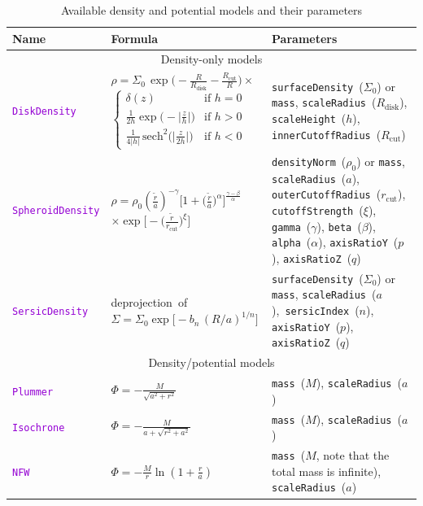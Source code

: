 \documentclass[12pt]{article}
\newcommand{\ttt}[1]{\textcolor{darkviolet}{\texttt{#1}}}
\newcommand{\ppp}[1]{\textcolor{darkolive} {\texttt{#1}}}
\begin{document}
\begin{table}
\caption{Available density and potential models and their parameters}  \label{tab:PotentialParams}
\begin{tabular}{l m{5cm} >{\raggedright\arraybackslash}m{6cm}}
Name & Formula & Parameters \\
\hline
\multicolumn{3}{c}{Density-only models} \\[2mm]
\ttt{DiskDensity} & $\rho = \Sigma_0\,\exp\big(-\frac{R}{R_\mathrm{disk}}-\frac{R_\mathrm{cut}}{R}\big)\times$
$\left\{ \begin{array}{ll} \delta(z) & \mbox{if } h=0 \\[1mm]
\frac{1}{2h} \exp\big(-\big|\frac{z}{h}\big|\big) & \mbox{if } h>0 \\[1mm]
\frac{1}{4|h|}\, \mathrm{sech}^2\big(\big|\frac{z}{2h}\big|\big) & \mbox{if } h<0 \end{array} \right. $ &
\ppp{surfaceDensity}~($\Sigma_0$) or \ppp{mass}, \ppp{scaleRadius}~($R_\mathrm{disk}$), \ppp{scaleHeight}~($h$), \ppp{innerCutoffRadius}~($R_\mathrm{cut}$)\\
\ttt{SpheroidDensity} & $\rho = \rho_0  \left(\frac{\tilde r}{a}\right)^{-\gamma} \Big[ 1 + \big(\frac{\tilde r}{a}\big)^\alpha \Big]^{\frac{\gamma-\beta}{\alpha}}$ $\times \exp\Big[ -\big(\frac{\tilde r}{r_\mathrm{cut}}\big)^\xi\Big] $ &
\ppp{densityNorm}~($\rho_0$) or \ppp{mass}, \ppp{scaleRadius}~($a$), \ppp{outerCutoffRadius}~($r_\mathrm{cut}$), \ppp{cutoffStrength}~($\xi$),\hspace{1cm} \ppp{gamma}~($\gamma$), \ppp{beta}~($\beta$), \ppp{alpha}~($\alpha$), \ppp{axisRatioY}~($p$), \ppp{axisRatioZ}~($q$) \\[2mm]
\ttt{SersicDensity} & \mbox{deprojection of} \mbox{$\Sigma = \Sigma_0 \exp\big[-b_n\,(R/a)^{1/n}\big]$} & \ppp{surfaceDensity}~($\Sigma_0$) or \ppp{mass}, \ppp{scaleRadius}~($a$),~\ppp{sersicIndex}~($n$), \ppp{axisRatioY}~($p$), \ppp{axisRatioZ}~($q$) \\[2mm]
\multicolumn{3}{c}{Density/potential models} \\[2mm]
\ttt{Plummer} & $\Phi = -\frac{M}{\sqrt{a^2+r^2}}$ & \ppp{mass}~($M$), \ppp{scaleRadius}~($a$) \\[2mm]
\ttt{Isochrone} & $\Phi = - \frac{M}{a + \sqrt{r^2 + a^2}}$ & \ppp{mass}~($M$), \ppp{scaleRadius}~($a$) \\[2mm]
\ttt{NFW} & $\Phi = -\frac{M}{r} \ln\left(1 + \frac{r}{a}\right)$ & \ppp{mass}~($M$, {\footnotesize note that the total mass is infinite}), \ppp{scaleRadius}~($a$) \\[2mm]

\end{tabular}
\end{table}
\end{document}
